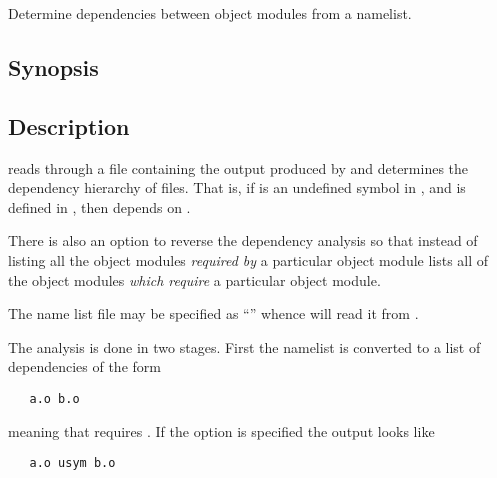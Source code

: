 Determine dependencies between object modules from a namelist.

\subsection*{Synopsis}

\begin{synopsis}
\end{synopsis}

\subsection*{Description}

 reads through a file containing the output produced by
 and determines the dependency hierarchy of  files.  That
is, if  is an undefined symbol in , and  is defined
in , then  depends on .

There is also an option to reverse the dependency analysis so that instead of
listing all the object modules {\em required by} a particular object module
 lists all of the object modules {\em which require} a particular
object module.

The name list file may be specified as ``\file{-}'' whence  will
read it from .

The analysis is done in two stages.  First the namelist is converted to a list
of dependencies of the form

\begin{verbatim}
   a.o b.o
\end{verbatim}

\noindent
meaning that  requires .  If the  option is
specified the output looks like

\begin{verbatim}
   a.o usym b.o
\end{verbatim}

